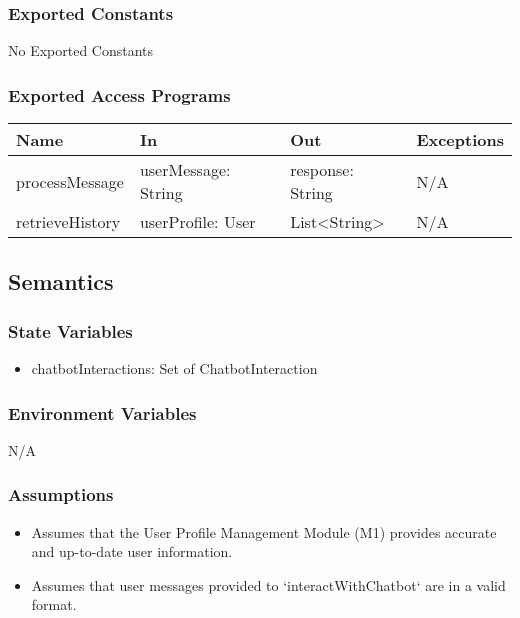 \documentclass[12pt, titlepage]{article}
\begin{document}
\subsubsection{Exported Constants}
No Exported Constants


\subsubsection{Exported Access Programs}

\begin{center}
\begin{tabular}{l l l l}
\hline
\textbf{Name} & \textbf{In} & \textbf{Out} & \textbf{Exceptions} \\
\hline
processMessage & userMessage: String & response: String  & N/A \\
retrieveHistory & userProfile: User & List\textless String\textgreater   & N/A \\
\hline
\end{tabular}
\end{center}

\subsection{Semantics}

\subsubsection{State Variables}
\begin{itemize}
\item chatbotInteractions: Set of ChatbotInteraction
\end{itemize}

\subsubsection{Environment Variables}
N/A

\subsubsection{Assumptions}
\begin{itemize}
\item Assumes that the User Profile Management Module (M1) provides accurate and up-to-date user information.
\item Assumes that user messages provided to `interactWithChatbot` are in a valid format.
\end{itemize}
\end{document}
